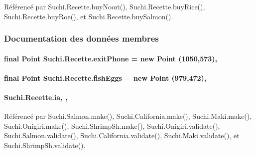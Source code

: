 Référencé par Suchi.\+Recette.\+buy\+Noori(), Suchi.\+Recette.\+buy\+Rice(), Suchi.\+Recette.\+buy\+Roe(), et Suchi.\+Recette.\+buy\+Salmon().



\subsubsection{Documentation des données membres}
\hypertarget{classSuchi_1_1Recette_ac7ff51ea8fa06174c38c52121b0ef767}{}
\paragraph[{exit\+Phone}]{\setlength{\rightskip}{0pt plus 5cm}final Point Suchi.\+Recette.\+exit\+Phone = new Point (1050,573)\hspace{0.3cm}{\ttfamily [protected]}, {\ttfamily [inherited]}}\label{classSuchi_1_1Recette_ac7ff51ea8fa06174c38c52121b0ef767}
\hypertarget{classSuchi_1_1Recette_a9d19fcc0de54e124694592bc35d97a1d}{}
\paragraph[{fish\+Eggs}]{\setlength{\rightskip}{0pt plus 5cm}final Point Suchi.\+Recette.\+fish\+Eggs = new Point (979,472)\hspace{0.3cm}{\ttfamily [protected]}, {\ttfamily [inherited]}}\label{classSuchi_1_1Recette_a9d19fcc0de54e124694592bc35d97a1d}
\hypertarget{classSuchi_1_1Recette_add9d95ee8955e02592b553c7e4b719a0}{}
\paragraph[{ia}]{ Suchi.\+Recette.\+ia\hspace{0.3cm}{\ttfamily [static]}, {\ttfamily [protected]}, {\ttfamily [inherited]}}\label{classSuchi_1_1Recette_add9d95ee8955e02592b553c7e4b719a0}


Référencé par Suchi.\+Salmon.\+make(), Suchi.\+California.\+make(), Suchi.\+Maki.\+make(), Suchi.\+Onigiri.\+make(), Suchi.\+Shrimp\+Sh.\+make(), Suchi.\+Onigiri.\+validate(), Suchi.\+Salmon.\+validate(), Suchi.\+California.\+validate(), Suchi.\+Maki.\+validate(), et Suchi.\+Shrimp\+Sh.\+validate().

